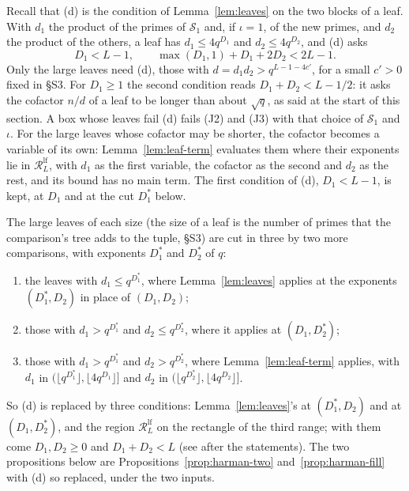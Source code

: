 \documentclass[11pt]{article}
\theoremstyle{definition}
\begin{document}
Recall that (d) is the condition of Lemma~\ref{lem:leaves} on the two blocks of a leaf. With $d_1$ the product of the
primes of $\mathcal S_1$ and, if $\iota = 1$, of the new primes, and $d_2$ the product of the others, a leaf has $d_1
\le 4q^{D_1}$ and $d_2 \le 4q^{D_2}$, and (d) asks
\[
  D_1 < L - 1, \qquad \max(D_1, 1) + D_1 + 2D_2 < 2L - 1.
\]
Only the large leaves need (d), those with $d = d_1 d_2 > q^{L - 1 - 4c'}$, for a small $c' > 0$ fixed in \S S3. For
$D_1 \ge 1$ the second condition reads $D_1 + D_2 < L - 1/2$: it asks the cofactor $n/d$ of a leaf to be longer than
about $\sqrt q$, as said at the start of this section. A box whose leaves fail (d) fails (J2) and (J3) with that
choice of $\mathcal S_1$ and $\iota$. For the large leaves whose cofactor may be shorter, the cofactor becomes a
variable of its own: Lemma~\ref{lem:leaf-term} evaluates them where their exponents lie in $\mathcal
R^{\mathrm{lf}}_L$, with $d_1$ as the first variable, the cofactor as the second and $d_2$ as the rest, and its bound
has no main term. The first condition of (d), $D_1 < L - 1$, is kept, at $D_1$ and at the cut $D_1^*$ below.

The large leaves of each size (the size of a leaf is the number of primes that the comparison's tree adds to the
tuple, \S S3) are cut in three by two more comparisons, with exponents $D_1^*$ and $D_2^*$ of $q$:
\begin{enumerate}
\item[(T1)] the leaves with $d_1 \le q^{D_1^*}$, where Lemma~\ref{lem:leaves} applies at the exponents $(D_1^*, D_2)$ in
  place of $(D_1, D_2)$;
\item[(T2)] those with $d_1 > q^{D_1^*}$ and $d_2 \le q^{D_2^*}$, where it applies at $(D_1, D_2^*)$;
\item[(T3)] those with $d_1 > q^{D_1^*}$ and $d_2 > q^{D_2^*}$, where Lemma~\ref{lem:leaf-term} applies, with $d_1$ in
  $(\lfloor q^{D_1^*} \rfloor, \lfloor 4q^{D_1} \rfloor]$ and $d_2$ in $(\lfloor q^{D_2^*} \rfloor, \lfloor 4q^{D_2}
  \rfloor]$.
\end{enumerate}
So (d) is replaced by three conditions: Lemma~\ref{lem:leaves}'s at $(D_1^*, D_2)$ and at $(D_1, D_2^*)$, and the
region $\mathcal R^{\mathrm{lf}}_L$ on the rectangle of the third range; with them come $D_1, D_2 \ge 0$ and $D_1 + D_2
< L$ (see after the statements). The two propositions below are
Propositions~\ref{prop:harman-two} and~\ref{prop:harman-fill} with (d) so replaced, under the two inputs.
\end{document}
